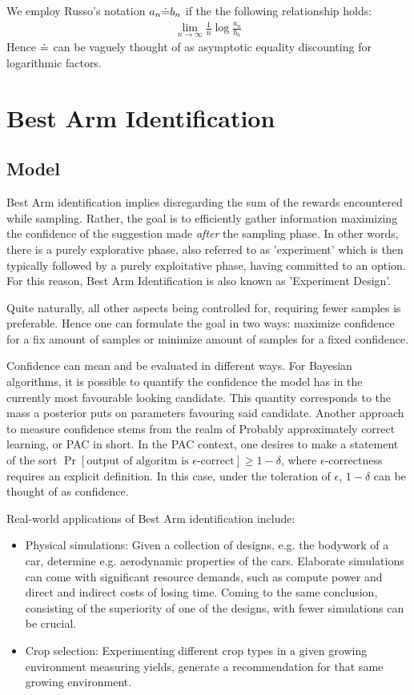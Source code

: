We employ Russo's notation $a_n \dot{=} b_n$ if the the following relationship holds:
\begin{align}
  \lim_{n \rightarrow \infty}\frac{1}{n}\log{\frac{a_n}{b_n}}
\end{align}
Hence $\dot{=}$ can be vaguely thought of as asymptotic equality discounting for logarithmic factors.

\section{Best Arm Identification}
\subsection{Model}\label{ss:top-1_model}

Best Arm identification implies disregarding the sum of the rewards encountered while sampling. Rather, the goal is to efficiently gather information maximizing the confidence of the suggestion made \emph{after} the sampling phase. In other words, there is a purely explorative phase, also referred to as 'experiment' which is then typically followed by a purely exploitative phase, having committed to an option. For this reason, Best Arm Identification is also known as 'Experiment Design'.

Quite naturally, all other aspects being controlled for, requiring fewer samples is preferable. Hence one can formulate the goal in two ways: maximize confidence for a fix amount of samples or minimize amount of samples for a fixed confidence.

Confidence can mean and be evaluated in different ways. For Bayesian algorithms, it is possible to quantify the confidence the model has in the currently most favourable looking candidate. This quantity corresponds to the mass a posterior puts on parameters favouring said candidate. Another approach to measure confidence stems from the realm of Probably approximately correct learning, or PAC in short. In the PAC context, one desires to make a statement of the sort $\Pr[\text{output of algoritm is $\epsilon$-correct}] \geq 1 - \delta$, where $\epsilon$-correctness requires an explicit definition. In this case, under the toleration of $\epsilon$, $1 - \delta$ can be thought of as confidence.

Real-world applications of Best Arm identification include:
\begin{itemize}
  \item Physical simulations: Given a collection of designs, e.g. the bodywork of a car, determine e.g. aerodynamic properties of the cars. Elaborate simulations can come with significant resource demands, such as compute power and direct and indirect costs of losing time. Coming to the same conclusion, consisting of the superiority of one of the designs, with fewer simulations can be crucial.
  \item Crop selection: Experimenting different crop types in a given growing environment measuring yields, generate a recommendation for that same growing environment.
\end{itemize}

